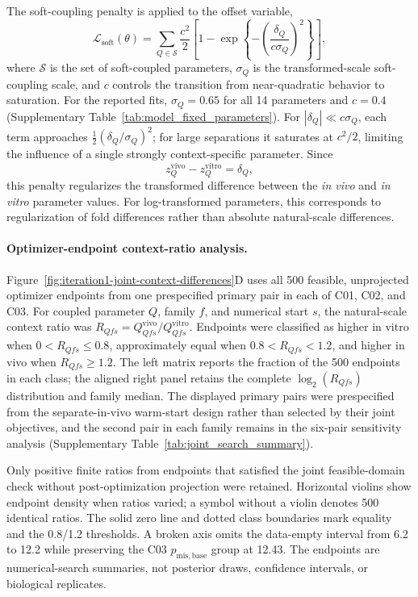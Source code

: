 \documentclass[11pt]{article}
\begin{document}
The soft-coupling penalty is applied to the offset variable,
\begin{equation}
\mathcal L_{\mathrm{soft}}(\theta)
=
\sum_{Q\in\mathcal S}
\frac{c^2}{2}
\left[
1-\exp\!\left\{
-\left(\frac{\delta_Q}{c\sigma_Q}\right)^2
\right\}
\right],
\label{eq:appendix_joint_soft_penalty}
\end{equation}
where $\mathcal S$ is the set of soft-coupled parameters, $\sigma_Q$ is the transformed-scale soft-coupling scale, and $c$ controls the transition from near-quadratic behavior to saturation. For the reported fits, $\sigma_Q=0.65$ for all 14 parameters and $c=0.4$ (Supplementary Table~\ref{tab:model_fixed_parameters}). For $|\delta_Q|\ll c\sigma_Q$, each term approaches $\tfrac{1}{2}(\delta_Q/\sigma_Q)^2$; for large separations it saturates at $c^2/2$, limiting the influence of a single strongly context-specific parameter. Since
\[
z_Q^{\mathrm{vivo}}-z_Q^{\mathrm{vitro}}=\delta_Q,
\]
this penalty regularizes the transformed difference between the \textit{in vivo} and \textit{in vitro} parameter values. For log-transformed parameters, this corresponds to regularization of fold differences rather than absolute natural-scale differences.

\paragraph{Optimizer-endpoint context-ratio analysis.}
Figure~\ref{fig:iteration1-joint-context-differences}D uses all 500 feasible, unprojected optimizer endpoints from one prespecified primary pair in each of C01, C02, and C03. For coupled parameter $Q$, family $f$, and numerical start $s$, the natural-scale context ratio was $R_{Qfs}=Q^{\mathrm{vivo}}_{Qfs}/Q^{\mathrm{vitro}}_{Qfs}$. Endpoints were classified as higher in vitro when $0<R_{Qfs}\leq0.8$, approximately equal when $0.8<R_{Qfs}<1.2$, and higher in vivo when $R_{Qfs}\geq1.2$. The left matrix reports the fraction of the 500 endpoints in each class; the aligned right panel retains the complete $\log_2(R_{Qfs})$ distribution and family median. The displayed primary pairs were prespecified from the separate-in-vivo warm-start design rather than selected by their joint objectives, and the second pair in each family remains in the six-pair sensitivity analysis (Supplementary Table~\ref{tab:joint_search_summary}).

Only positive finite ratios from endpoints that satisfied the joint feasible-domain check without post-optimization projection were retained. Horizontal violins show endpoint density when ratios varied; a symbol without a violin denotes 500 identical ratios. The solid zero line and dotted class boundaries mark equality and the 0.8/1.2 thresholds. A broken axis omits the data-empty interval from 6.2 to 12.2 while preserving the C03 $p_{\mathrm{mis,base}}$ group at 12.43. The endpoints are numerical-search summaries, not posterior draws, confidence intervals, or biological replicates.
\end{document}
